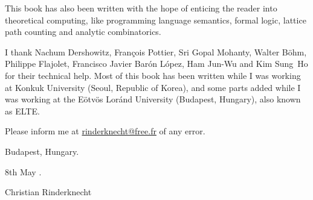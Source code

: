 This book has also been written with the hope of enticing the reader
into theoretical computing, like programming language semantics,
formal logic, lattice path counting and analytic combinatorics.

I thank Nachum Dershowitz, Fran\c{c}ois Pottier, Sri Gopal Mohanty,
Walter B\"ohm, Philippe Flajolet, Francisco Javier Bar\'on L\'opez,
Ham Jun-Wu and Kim Sung~Ho for their technical help. Most of this book
has been written while I was working at Konkuk University (Seoul,
Republic of Korea), and some parts added while I was working at the
E\"otv\"os Lor\'and University (Budapest, Hungary), also known as
ELTE.

Please inform me at \url{rinderknecht@free.fr} of any error.

\bigskip

\hfill{}Budapest, Hungary.


\hfill{}8th May .

\bigskip

\hfill{}Christian Rinderknecht
